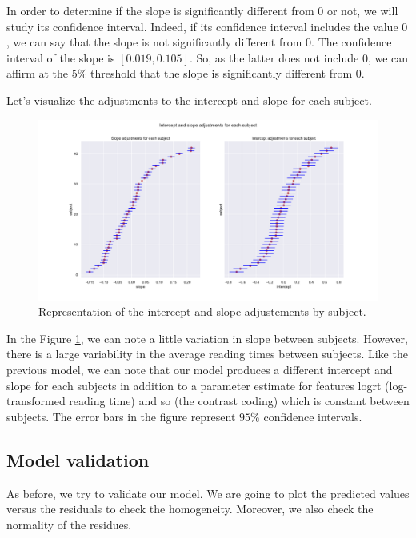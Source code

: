 \documentclass{article}
\begin{document}
In order to determine if the slope is significantly different from $0$ or not, we will study its confidence interval.
Indeed, if its confidence interval includes the value $0$, we can say that the slope is not significantly different from $0$.
The confidence interval of the slope is $[0.019, 0.105]$. So, as the latter does not include $0$, we can affirm at the $5\%$ threshold that the slope is significantly different from $0$.

Let's visualize the adjustments to the intercept and slope for each subject.

\begin{figure}[H]
    \centering
    \includegraphics[scale=.42]{./images/model2_inter.pdf}
    \caption{Representation of the intercept and slope adjustements by subject.}
    \label{fig:model2}
\end{figure}

In the Figure \ref{fig:model2}, we can note a little variation in slope between subjects. However, there is a large variability in the average reading times between subjects. Like the previous model, we can note that our model produces a different intercept and slope for each subjects in addition to a parameter estimate for features logrt (log-transformed reading time) and so (the contrast coding) which is constant between subjects. The error bars in the figure represent $95\%$ confidence intervals.

\subsection{Model validation}
As before, we try to validate our model.
We are going to plot the predicted values versus the residuals to check the homogeneity. Moreover, we also check the normality of the residues.
\end{document}
